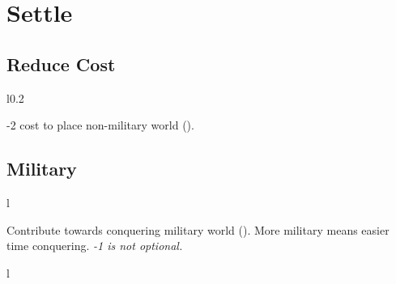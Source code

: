\documentclass[letterpaper,landscape,twocolumn,8pt]{extarticle}
\newcommand{\inline}[1]{\scalerel*{#1}{M}}
\begin{document}

\section{Settle}%

\begin{minipage}[t]{0.31\columnwidth}
\RaggedRight{}
\subsection*{Reduce Cost}
\setlength{\intextsep}{0pt}%

\begin{wrapfigure}{l}{0.2\columnwidth}
    
\end{wrapfigure}

-2 cost to place non-military world
(\inline{}).
\subsection*{Military}
\begin{wrapfigure}{l}{\columnwidth}
    
    
\end{wrapfigure}

Contribute towards conquering military world
(\inline{}). More military means
easier time conquering.
\smallbreak{}
\textit{-1 is not optional.}

\begin{wrapfigure}{l}{\columnwidth}
    
    
\end{wrapfigure}


\end{minipage}
\end{document}
